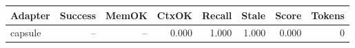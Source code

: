 \begin{tabular}{lrrrrrrr}
\hline
Adapter & Success & MemOK & CtxOK & Recall & Stale & Score & Tokens \\
\hline
capsule & -- & -- & 0.000 & 1.000 & 1.000 & 0.000 & 0 \\
\hline
\end{tabular}
